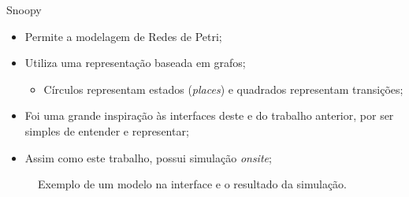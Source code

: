 \begin{frame}{Snoopy}
    \begin{itemize}
        \item Permite a modelagem de Redes de Petri;
        \item Utiliza uma representação baseada em grafos;
            \begin{itemize}
                \item Círculos representam estados (\textit{places}) e quadrados representam transições;
            \end{itemize}
        \item Foi uma grande inspiração às interfaces deste e do trabalho anterior, por ser simples de entender e representar;
        \item Assim como este trabalho, possui simulação \textit{onsite};
    \end{itemize}

    \begin{figure}
        \centering
    
        \quad
    
        \caption{Exemplo de um modelo na interface e o resultado da simulação.}
    \end{figure}

\end{frame}

